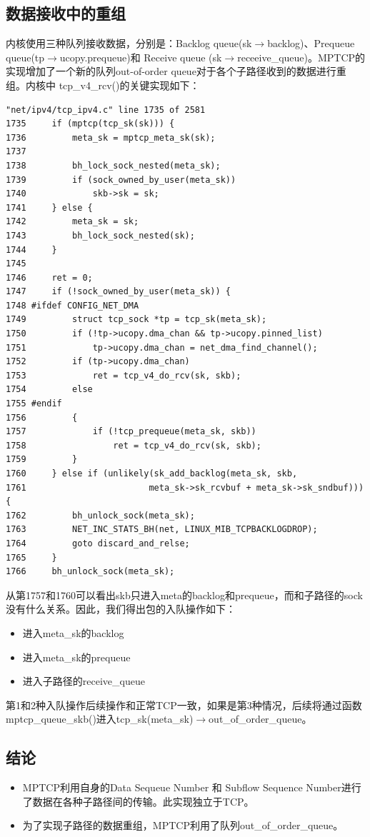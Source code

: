 \subsection{数据接收中的重组}
内核使用三种队列接收数据，分别是：Backlog queue(sk$\rightarrow$backlog)、Prequeue queue(tp$\rightarrow$ucopy.prequeue)和 Receive queue (sk$\rightarrow$receeive\_queue)。MPTCP的实现增加了一个新的队列out-of-order queue对于各个子路径收到的数据进行重组。内核中 tcp\_v4\_rcv()的关键实现如下：
\small\begin{verbatim}
"net/ipv4/tcp_ipv4.c" line 1735 of 2581
1735     if (mptcp(tcp_sk(sk))) {
1736         meta_sk = mptcp_meta_sk(sk);
1737
1738         bh_lock_sock_nested(meta_sk);
1739         if (sock_owned_by_user(meta_sk))
1740             skb->sk = sk;
1741     } else {
1742         meta_sk = sk;
1743         bh_lock_sock_nested(sk);
1744     }
1745
1746     ret = 0;
1747     if (!sock_owned_by_user(meta_sk)) {
1748 #ifdef CONFIG_NET_DMA
1749         struct tcp_sock *tp = tcp_sk(meta_sk);
1750         if (!tp->ucopy.dma_chan && tp->ucopy.pinned_list)
1751             tp->ucopy.dma_chan = net_dma_find_channel();
1752         if (tp->ucopy.dma_chan)
1753             ret = tcp_v4_do_rcv(sk, skb);
1754         else
1755 #endif
1756         {
1757             if (!tcp_prequeue(meta_sk, skb))
1758                 ret = tcp_v4_do_rcv(sk, skb);
1759         }
1760     } else if (unlikely(sk_add_backlog(meta_sk, skb,
1761                        meta_sk->sk_rcvbuf + meta_sk->sk_sndbuf))) {
1762         bh_unlock_sock(meta_sk);
1763         NET_INC_STATS_BH(net, LINUX_MIB_TCPBACKLOGDROP);
1764         goto discard_and_relse;
1765     }
1766     bh_unlock_sock(meta_sk);
\end{verbatim}\normalsize
从第1757和1760可以看出skb只进入meta的backlog和prequeue，而和子路径的sock没有什么关系。因此，我们得出包的入队操作如下：
\begin{itemize}
  \item 进入meta\_sk的backlog
  \item 进入meta\_sk的prequeue
  \item 进入子路径的receive\_queue
\end{itemize}
第1和2种入队操作后续操作和正常TCP一致，如果是第3种情况，后续将通过函数mptcp\_queue\_skb()进入tcp\_sk(meta\_sk)$\rightarrow$out\_of\_order\_queue。{\color{red}{我觉得我研究的地方应该是这里}}
\subsection{结论}
\begin{itemize}
  \item MPTCP利用自身的Data Sequeue Number  和  Subflow Sequence Number进行了数据在各种子路径间的传输。此实现独立于TCP。
  \item 为了实现子路径的数据重组，MPTCP利用了队列out\_of\_order\_queue。
\end{itemize}